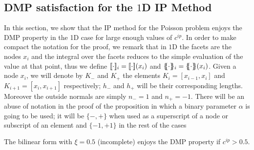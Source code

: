 \subsection{DMP satisfaction for the $1$D IP Method}\label{ss-dmp}
In this section, we show that the IP method for the Poisson problem  enjoys the DMP property in the 1D  case for large enough values of $c^{ip}$.
In order to make compact the notation for the proof, we remark that in $1$D the facets are the nodes $x_i$ and the integral over the facets reduces to the simple evaluation of the value at that point, thus we define $\lbrack\!\lbrack \cdot \rbrack\!\rbrack_i=\lbrack\!\lbrack \cdot \rbrack\!\rbrack(x_i)$ and $\mean{\cdot}_i=\mean{\cdot}(x_i)$. Given a node $x_i$, we will denote  by $K_-$ and $K_+$ the elements $K_i=[x_{i-1},x_i]$ and $K_{i+1}=[x_i,x_{i+1}]$ respectively; $h_-$ and $h_+$ will be their corresponding lengths. Moreover the outside normals are simply $n_-=1$ and $n_+=-1$. There will be an abuse of notation in the proof of the proposition in which a binary parameter $\alpha$ is going to be used; it will be $\{-,+\}$ when used as a superscript of a node or subscript of an element and $\{-1,+1\}$ in the rest of the cases
\begin{lemma}
\label{dmpois}
The bilinear form  with $\xi = 0.5$ (incomplete) enjoys the DMP property if $c^{ip}>0.5$.
\end{lemma}
